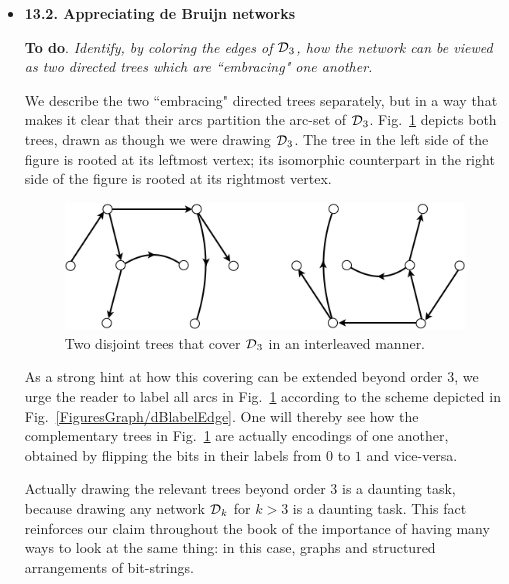 \begin{itemize}
\item
{\bf 13.2. Appreciating de Bruijn networks}

\smallskip

{\bf To do}.
{\em Identify, by coloring the edges of $\mbox{$\cal D$}_3$, how the network can be viewed as two directed trees which are ``embracing" one another.}

\smallskip

We describe the two ``embracing" directed trees separately, but in a way that makes it clear that their arcs partition the arc-set of $\mbox{$\cal D$}_3$.  Fig.~\ref{fig:DeBruijn3Tree} depicts both trees, drawn as though we were drawing $\mbox{$\cal D$}_3$.  The tree in the left side of the figure is rooted at its leftmost vertex;  its isomorphic counterpart in the right side of the figure is rooted at its rightmost vertex. 
\begin{figure}[h]
\begin{center}
        \includegraphics[scale=0.4]{FiguresGraph/DeBruijn3Tree}
        \caption{Two disjoint trees that cover $\mbox{$\cal D$}_3$ in an interleaved manner.}
        \label{fig:DeBruijn3Tree}
\end{center}
\end{figure}

\smallskip

As a strong hint at how this covering can be extended beyond order $3$, we urge the reader to label all arcs in Fig.~\ref{fig:DeBruijn3Tree} according to the scheme depicted in Fig.~\ref{FiguresGraph/dBlabelEdge}.  One will thereby see how the complementary trees in Fig.~\ref{fig:DeBruijn3Tree} are actually encodings of one another, obtained by flipping the bits in their labels from $0$ to $1$ and vice-versa.

\smallskip

Actually drawing the relevant trees beyond order $3$ is a daunting task, because drawing any network $\mbox{$\cal D$}_k$ for $k > 3$ is a daunting task.  This fact reinforces our claim throughout the book of the importance of having many ways to look at the same thing: in this case, graphs and structured arrangements of bit-strings.



\end{itemize}

